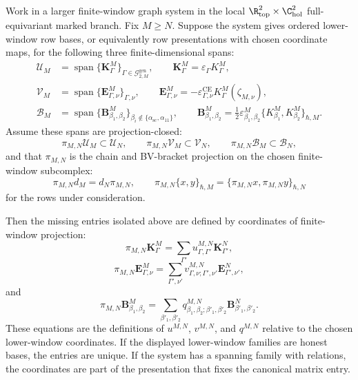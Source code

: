 \begin{prop}\label{prop:projection-defined-uvq-truncation-data}
  Work in a larger finite-window graph system in the local
  \(\R^2_{\mathrm{top}}\times\C^2_{\mathrm{hol}}\) full-equivariant marked
  branch.  Fix \(M\geq N\).  Suppose the system gives ordered
  lower-window row bases, or equivalently row presentations with chosen
  coordinate maps, for the following three finite-dimensional spans:
  \[
  \begin{aligned}
    \mathcal U_M
      &=
      \operatorname{span}\{\mathbf K^M_\Gamma\}_{\Gamma\in
      \mathcal G^{\mathrm{gen}}_{2,M}},
      \qquad
      \mathbf K^M_\Gamma=\varepsilon_\Gamma K^M_\Gamma,\\
    \mathcal V_M
      &=
      \operatorname{span}\{\mathbf E^M_{\Gamma,\nu}\}_{\Gamma,\nu},
      \qquad
      \mathbf E^M_{\Gamma,\nu}
        =
      -\varepsilon^{\mathrm{CE}}_{\Gamma,\nu}
      K^M_\Gamma(\zeta_{M,\nu}),\\
    \mathcal B_M
      &=
      \operatorname{span}\{\mathbf B^M_{\beta_1,\beta_2}\}_{\beta_i\notin
      \{\alpha_{\mathrm{sc}},\alpha_{11}\}},
      \qquad
      \mathbf B^M_{\beta_1,\beta_2}
        =
      \frac12\varepsilon^M_{\beta_1,\beta_2}
      \{K^M_{\beta_1},K^M_{\beta_2}\}_{\hbar,M}.
  \end{aligned}
  \]
  Assume these spans are projection-closed:
  \[
    \pi_{M,N}\mathcal U_M\subset\mathcal U_N,\qquad
    \pi_{M,N}\mathcal V_M\subset\mathcal V_N,\qquad
    \pi_{M,N}\mathcal B_M\subset\mathcal B_N,
  \]
  and that \(\pi_{M,N}\) is the chain and BV-bracket projection on the
  chosen finite-window subcomplex:
  \[
    \pi_{M,N}d_M=d_N\pi_{M,N},
    \qquad
    \pi_{M,N}\{x,y\}_{\hbar,M}
      =
    \{\pi_{M,N}x,\pi_{M,N}y\}_{\hbar,N}
  \]
  for the rows under consideration.

  Then the missing entries isolated above are defined by coordinates of
  finite-window projection:
  \[
    \pi_{M,N}\mathbf K^M_\Gamma
      =
    \sum_{\Gamma'}
      u^{M,N}_{\Gamma,\Gamma'}\mathbf K^N_{\Gamma'},
  \]
  \[
    \pi_{M,N}\mathbf E^M_{\Gamma,\nu}
      =
    \sum_{\Gamma',\nu'}
      v^{M,N}_{\Gamma,\nu;\Gamma',\nu'}
      \mathbf E^N_{\Gamma',\nu'},
  \]
  and
  \[
    \pi_{M,N}\mathbf B^M_{\beta_1,\beta_2}
      =
    \sum_{\beta'_1,\beta'_2}
      q^{M,N}_{\beta_1,\beta_2;\beta'_1,\beta'_2}
      \mathbf B^N_{\beta'_1,\beta'_2}.
  \]
  These equations are the definitions of \(u^{M,N}\), \(v^{M,N}\), and
  \(q^{M,N}\) relative to the chosen lower-window coordinates.  If the
  displayed lower-window families are honest bases, the entries are unique.
  If the system has a spanning family with relations, the
  coordinates are part of the presentation that fixes the
  canonical matrix entry.


\end{prop}
